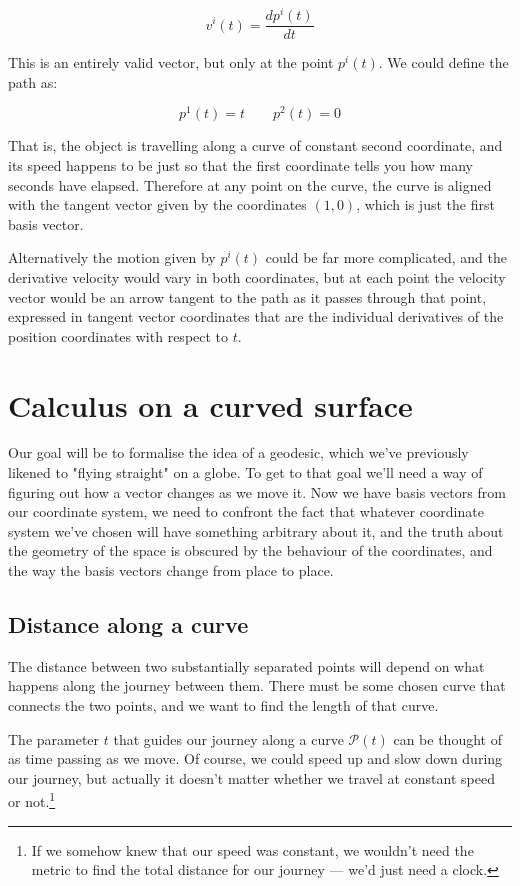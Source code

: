 $$
v^i(t) = \frac{d p^i(t)}{dt}
$$

This is an entirely valid vector, but only at the point $p^i(t)$. We could define the path as:

$$
p^1(t) = t \quad \quad p^2(t) = 0
$$

That is, the object is travelling along a curve of constant second coordinate, and its speed happens to be just so that the first coordinate tells you how many seconds have elapsed. Therefore at any point on the curve, the curve is aligned with the tangent vector given by the coordinates $(1, 0)$, which is just the first basis vector.

Alternatively the motion given by $p^i(t)$ could be far more complicated, and the derivative velocity would vary in both coordinates, but at each point the velocity vector would be an arrow tangent to the path as it passes through that point, expressed in tangent vector coordinates that are the individual derivatives of the position coordinates with respect to $t$.

\section{Calculus on a curved surface}

Our goal will be to formalise the idea of a geodesic, which we've previously likened to "flying straight" on a globe. To get to that goal we'll need a way of figuring out how a vector changes as we move it. Now we have basis vectors from our coordinate system, we need to confront the fact that whatever coordinate system we've chosen will have something arbitrary about it, and the truth about the geometry of the space is obscured by the behaviour of the coordinates, and the way the basis vectors change from place to place.

\subsection{Distance along a curve}

The distance between two substantially separated points will depend on what happens along the journey between them. There must be some chosen curve that connects the two points, and we want to find the length of that curve.

The parameter $t$ that guides our journey along a curve $\mathcal{P}(t)$ can be thought of as time passing as we move. Of course, we could speed up and slow down during our journey, but actually it doesn't matter whether we travel at constant speed or not.\footnote{If we somehow knew that our speed was constant, we wouldn't need the metric to find the total distance for our journey --- we'd just need a clock.}

